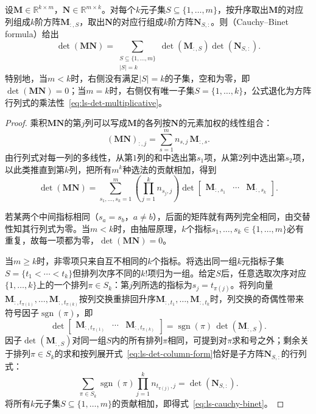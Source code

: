 \begin{theorem}
\label{thm:ls-cauchy-binet}
设$\bm M\in\mathbb R^{k\times m}$，$\bm N\in\mathbb R^{m\times k}$。对每个$k$元子集$S\subseteq\{1,\ldots,m\}$，按升序取出$\bm M$的对应列组成$k$阶方阵$\bm M_{:,S}$，取出$\bm N$的对应行组成$k$阶方阵$\bm N_{S,:}$。则（Cauchy--Binet formula）给出
\begin{equation}
 \det(\bm M\bm N)=
 \sum_{\substack{S\subseteq\{1,\ldots,m\}\\ |S|=k}}
 \det(\bm M_{:,S})\det(\bm N_{S,:}).
 \label{eq:ls-cauchy-binet}
\end{equation}
特别地，当$m<k$时，右侧没有满足$|S|=k$的子集，空和为零，即$\det(\bm M\bm N)=0$；当$m=k$时，右侧仅有唯一子集$S=\{1,\ldots,k\}$，公式退化为方阵行列式的乘法性~\eqref{eq:ls-det-multiplicative}。
\end{theorem}
\begin{proof}
乘积$\bm M\bm N$的第$j$列可以写成$\bm M$的各列按$\bm N$的元素加权的线性组合：
\[
 (\bm M\bm N)_{:,j}=\sum_{s=1}^{m} n_{s,j}\,\bm M_{:,s}.
\]
由行列式对每一列的多线性，从第$1$列的和中选出第$s_1$项，从第$2$列中选出第$s_2$项，以此类推直到第$k$列，把所有$m^k$种选法的贡献相加，得到
\[
 \det(\bm M\bm N)
 =\sum_{s_1,\ldots,s_k=1}^{m}
 \left(\prod_{j=1}^k n_{s_j,j}\right)
 \det\begin{bmatrix}\bm M_{:,s_1}&\cdots&\bm M_{:,s_k}\end{bmatrix}.
\]

若某两个中间指标相同（$s_a=s_b$，$a\neq b$），后面的矩阵就有两列完全相同，由交替性知其行列式为零。当$m<k$时，由抽屉原理，$k$个指标$s_1,\ldots,s_k\in\{1,\ldots,m\}$必有重复，故每一项都为零，$\det(\bm M\bm N)=0$。

当$m\geq k$时，非零项只来自互不相同的$k$个指标。将选出同一组$k$元指标子集$S=\{t_1<\cdots<t_k\}$但排列次序不同的$k!$项归为一组。给定$S$后，任意选取次序对应$\{1,\ldots,k\}$上的一个排列$\pi\in S_k$：第$j$列所选的指标为$s_j=t_{\pi(j)}$。将列向量$\bm M_{:,t_{\pi(1)}},\ldots,\bm M_{:,t_{\pi(k)}}$按列交换重排回升序$\bm M_{:,t_1},\ldots,\bm M_{:,t_k}$时，列交换的奇偶性带来符号因子$\operatorname{sgn}(\pi)$，即
\[
 \det\begin{bmatrix}\bm M_{:,t_{\pi(1)}}&\cdots&\bm M_{:,t_{\pi(k)}}\end{bmatrix}
 =\operatorname{sgn}(\pi)\,\det(\bm M_{:,S}).
\]
因子$\det(\bm M_{:,S})$对同一组$S$内的所有排列$\pi$相同，可提到对$\pi$求和号之外；剩余关于排列$\pi\in S_k$的求和按列展开式~\eqref{eq:ls-det-column-form}恰好是子方阵$\bm N_{S,:}$的行列式：
\[
 \sum_{\pi\in S_k}\operatorname{sgn}(\pi)\prod_{j=1}^k n_{t_{\pi(j)},j}
 =\det(\bm N_{S,:}).
\]
将所有$k$元子集$S\subseteq\{1,\ldots,m\}$的贡献相加，即得式~\eqref{eq:ls-cauchy-binet}。
\end{proof}

